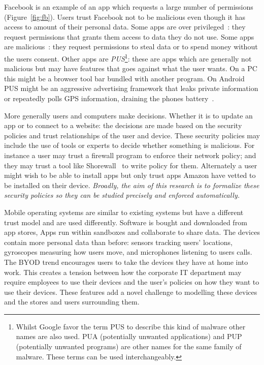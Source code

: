 \documentclass[a4paper]{article}
\begin{document}
Facebook is an example of an app which requests a large number of permissions
(Figure~\ref{fig:fb}). Users trust Facebook not to be malicious even though it
has access to amount of their personal data.  Some apps are over
privileged~\cite{Felt:2011kj}: they request permissions that grants them access
to data they do not use. Some apps are malicious~\cite{Zhou:2012cf}: they
request permissions to steal data or to spend money without the users consent.
Other apps are \emph{\ac{PUS}}\footnote{Whilst Google favor the term \ac{PUS} to
describe this kind of malware other names are also used. PUA (potentially
unwanted applications) and PUP (potentially unwanted programs) are other names
for the same family of malware.  These terms can be used interchangeably.}:
these are apps which are generally not malicious but may have features that goes
against what the user wants.  On a PC this might be a browser tool bar bundled
with another program.  On Android \ac{PUS} might be an aggressive advertising
framework that leaks private information or repeatedly polls GPS information,
draining the phones battery~\cite{Svajcer:2013tp}.

More generally users and computers make decisions. Whether it is to update an
app or to connect to a website: the decisions are made based on the security
policies and trust relationships of the user and device.  These security
policies may include the use of tools or experts to decide whether something is
malicious.  For instance a user may trust a firewall program to enforce their
network policy; and they may trust a tool like
{Shorewall}~\cite{Shorewall:uh,Tongaonkar:2007ua} to write
policy for them.  Alternately a user might wish to be able to install apps but
only trust apps {Amazon} have vetted to be installed on their device.
\emph{Broadly, the aim of this research is to formalize these security policies
so they can be studied precisely and enforced automatically.}

Mobile operating systems are similar to existing systems but have a
different trust model and are used differently.  Software is
bought and downloaded from app stores, Apps run within sandboxes and collaborate
to share data. The devices contain more personal data
than before: sensors tracking users' locations,  gyroscopes measuring how
users move, and microphones listening to users calls.  The \ac{BYOD} trend
encourages users to take the devices they have at home into work.
This creates a tension between how the corporate IT department may require
employees to use their devices and the user's policies on how they want to use
their devices.  These features add a novel challenge to modelling these devices
and the stores and users surrounding them.  
\end{document}
